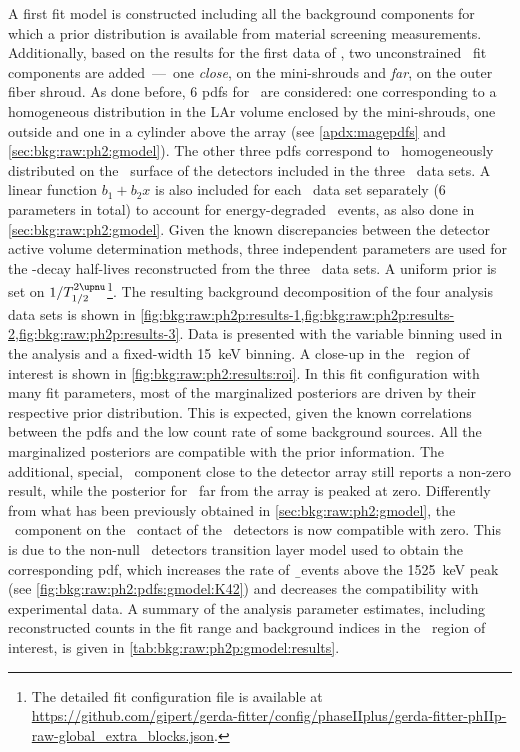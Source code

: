 A first fit model is constructed including all the background components for which a prior
distribution is available from material screening measurements. Additionally, based on the
results for the first data of \phasetwo, two unconstrained \kvn\ fit
components are added~---~one \emph{close}, on the mini-shrouds and \emph{far}, on the
outer fiber shroud. As done before, 6 pdfs for \kvz\ are considered: one corresponding to
a homogeneous distribution in the LAr volume enclosed by the mini-shrouds, one outside and
one in a cylinder above the array (see \cref{apdx:magepdfs} and
\cref{sec:bkg:raw:ph2:gmodel}). The other three pdfs correspond to \kvz\ homogeneously
distributed on the \nplus\ surface of the detectors included in the three \Mone\ data
sets. A linear function $b_1+b_2x$ is also included for each \Mone\ data set
separately (6 parameters in total) to account for energy-degraded \a\ events, as also
done in \cref{sec:bkg:raw:ph2:gmodel}. Given the known discrepancies between the detector
active volume determination methods, three independent parameters are used for the
\nnbb-decay half-lives reconstructed from the three \Mone\ data sets. A uniform prior is
set on $1/\thalftwoM$\footnote{%
  The detailed fit configuration file is available at
  \url{https://github.com/gipert/gerda-fitter/config/phaseIIplus/gerda-fitter-phIIp-raw-global_extra_blocks.json}.
}.
\newpar
The resulting background decomposition of the four analysis data sets is shown in
\cref{fig:bkg:raw:ph2p:results-1,fig:bkg:raw:ph2p:results-2,fig:bkg:raw:ph2p:results-3}.
Data is presented with the variable binning used in the analysis and a fixed-width 15~keV
binning. A close-up in the \onbb\ region of interest is shown in
\cref{fig:bkg:raw:ph2:results:roi}. In this fit configuration with many fit parameters,
most of the marginalized posteriors are driven by their respective prior distribution.
This is expected, given the known correlations between the pdfs and the low count rate of
some background sources. All the marginalized posteriors are compatible with the prior
information. The additional, special, \kvn\ component close to the detector array still
reports a non-zero result, while the posterior for \kvn\ far from the array is peaked at
zero.  Differently from what has been previously obtained in
\cref{sec:bkg:raw:ph2:gmodel}, the \kvz\ component on the \nplus\ contact of the \bege\
detectors is now compatible with zero. This is due to the non-null \bege\ detectors
transition layer model used to obtain the corresponding pdf, which increases the rate of
\b\ events above the 1525~keV peak (see \cref{fig:bkg:raw:ph2:pdfs:gmodel:K42}) and
decreases the compatibility with experimental data. A summary of the analysis parameter
estimates, including reconstructed counts in the fit range and background indices in the
\onbb\ region of interest, is given in \cref{tab:bkg:raw:ph2p:gmodel:results}.

